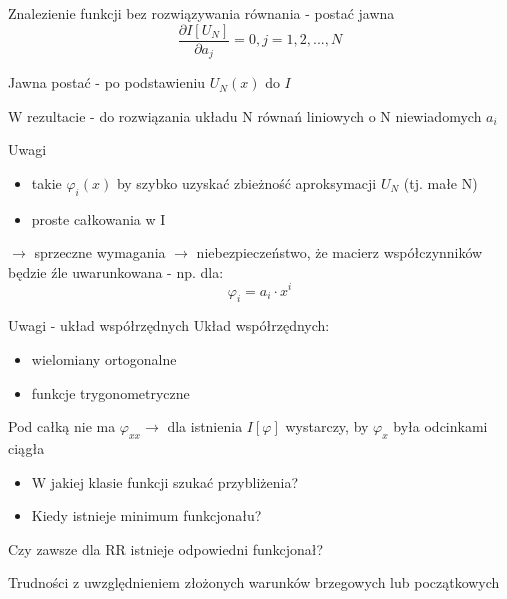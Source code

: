 	
	\begin{frame}{Znalezienie funkcji bez rozwiązywania równania - postać jawna}
		$$
		\frac{\partial I[U_N]}{\partial a_j} = 0, j = 1,2, ... , N
		$$
					
		Jawna postać - po podstawieniu $U_N(x)$ do $I$
					
		W rezultacie - do rozwiązania układu N równań liniowych o N niewiadomych $a_i$
					
	\end{frame}


	\begin{frame}{Uwagi}
		\begin{itemize}
			\item takie $\varphi_i(x)$ by szybko uzyskać zbieżność aproksymacji $U_N$ (tj. małe N)
			\item proste całkowania w I
		\end{itemize}
		
		$\rightarrow$ sprzeczne wymagania
		$\rightarrow$ niebezpieczeństwo, że macierz współczynników będzie źle uwarunkowana - np. dla:
		$$
		\varphi_i = a_i \cdot x^i
		$$
	
	\end{frame}

	
	\begin{frame}{Uwagi - układ współrzędnych}
		Układ współrzędnych:
		\begin{itemize}
			\item wielomiany ortogonalne
			\item funkcje trygonometryczne
		\end{itemize}
		
		
		Pod całką nie ma $\varphi_{xx} \rightarrow$ dla istnienia $I[\varphi]$ wystarczy, by $\varphi_x$ była odcinkami ciągła
		\begin{itemize}
			\item W jakiej klasie funkcji szukać przybliżenia?	
			\item Kiedy istnieje minimum funkcjonału?
		\end{itemize}	
		
		Czy zawsze dla RR istnieje odpowiedni funkcjonał?
		
		Trudności z uwzględnieniem złożonych warunków brzegowych lub początkowych
	\end{frame}


